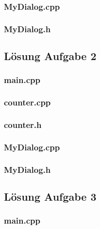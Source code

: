 \subsubsection{MyDialog.cpp}

\subsubsection{MyDialog.h}


\subsection{Lösung Aufgabe 2}
\subsubsection{main.cpp}

\subsubsection{counter.cpp}

\subsubsection{counter.h}

\subsubsection{MyDialog.cpp}

\subsubsection{MyDialog.h}


\subsection{Lösung Aufgabe 3}
\subsubsection{main.cpp}


